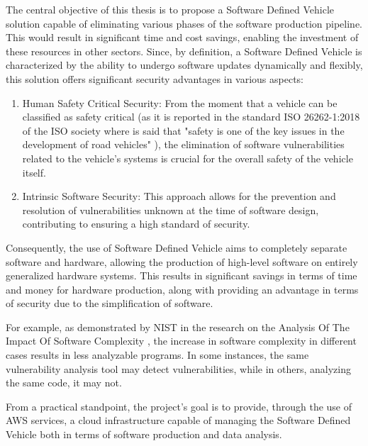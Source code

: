The central objective of this thesis is to propose a Software Defined Vehicle solution capable of eliminating various phases of the software production pipeline. This would result in significant time and cost savings, enabling the investment of these resources in other sectors. Since, by definition, a Software Defined Vehicle is characterized by the ability to undergo software updates dynamically and flexibly, this solution offers significant security advantages in various aspects:
\begin{enumerate}
  \item Human Safety Critical Security: From the moment that a vehicle can be classified as safety critical (as it is reported in the standard ISO 26262-1:2018 of the ISO society where is said that "safety is one of the key issues in the development of road vehicles" \cite{ISO26262}), the elimination of software vulnerabilities related to the vehicle's systems is crucial for the overall safety of the vehicle itself.  
  \item Intrinsic Software Security: This approach allows for the prevention and resolution of vulnerabilities unknown at the time of software design, contributing to ensuring a high standard of security.
\end{enumerate}

Consequently, the use of Software Defined Vehicle aims to completely separate software and hardware, allowing the production of high-level software on entirely generalized hardware systems. This results in significant savings in terms of time and money for hardware production, along with providing an advantage in terms of security due to the simplification of software.

For example, as demonstrated by NIST in the research on the Analysis Of The Impact Of Software Complexity \cite{NISTCodeComplexity}, the increase in software complexity in different cases results in less analyzable programs. In some instances, the same vulnerability analysis tool may detect vulnerabilities, while in others, analyzing the same code, it may not. 

From a practical standpoint, the project's goal is to provide, through the use of AWS services, a cloud infrastructure capable of managing the Software Defined Vehicle both in terms of software production and data analysis.